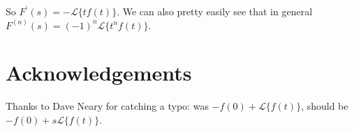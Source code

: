 \documentclass{article}
\theoremstyle{definition}
\begin{document}
\bigskip
\noindent
So $F^\prime(s) = -\mathcal{L}\{tf(t)\}$. We can also pretty easily see that in general $F^{(n)}(s) = (-1)^n \mathcal{L}\{t^n f(t)\}$.


\bigskip
\section*{Acknowledgements}
Thanks to Dave Neary for catching a typo: was $-f(0) + \mathcal{L}\{f(t)\}$, should be $-f(0) + s \mathcal{L}\{f(t)\} $.

\newpage


\end{document}
